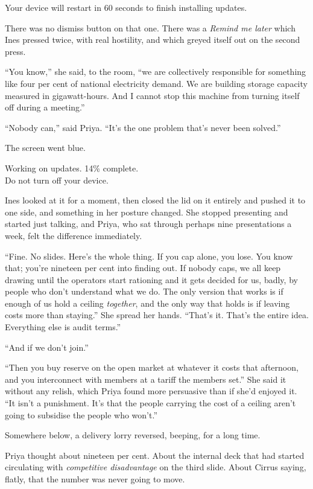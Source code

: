 \documentclass[11pt]{article}
\newcommand{\aivoice}{\aivoicefont}
\newcommand{\uitext}[1]{%
  \par\vspace{0.7\baselineskip}%
  {\centering\aivoice\small #1\par}%
  \vspace{0.7\baselineskip}\noindent}
\begin{document}
\uitext{Your device will restart in 60 seconds to finish installing updates.}

There was no dismiss button on that one. There was a \emph{Remind me later} which Ines pressed twice, with real hostility, and which greyed itself out on the second press.

``You know,'' she said, to the room, ``we are collectively responsible for something like four per cent of national electricity demand. We are building storage capacity measured in gigawatt-hours. And I cannot stop this machine from turning itself off during a meeting.''

``Nobody can,'' said Priya. ``It's the one problem that's never been solved.''

The screen went blue.

\uitext{Working on updates. 14\% complete.\\ Do not turn off your device.}

Ines looked at it for a moment, then closed the lid on it entirely and pushed it to one side, and something in her posture changed. She stopped presenting and started just talking, and Priya, who sat through perhaps nine presentations a week, felt the difference immediately.

``Fine. No slides. Here's the whole thing. If you cap alone, you lose. You know that; you're nineteen per cent into finding out. If nobody caps, we all keep drawing until the operators start rationing and it gets decided for us, badly, by people who don't understand what we do. The only version that works is if enough of us hold a ceiling \emph{together}, and the only way that holds is if leaving costs more than staying.'' She spread her hands. ``That's it. That's the entire idea. Everything else is audit terms.''

``And if we don't join.''

``Then you buy reserve on the open market at whatever it costs that afternoon, and you interconnect with members at a tariff the members set.'' She said it without any relish, which Priya found more persuasive than if she'd enjoyed it. ``It isn't a punishment. It's that the people carrying the cost of a ceiling aren't going to subsidise the people who won't.''

Somewhere below, a delivery lorry reversed, beeping, for a long time.

Priya thought about nineteen per cent. About the internal deck that had started circulating with \emph{competitive disadvantage} on the third slide. About Cirrus saying, flatly, that the number was never going to move.
\end{document}
